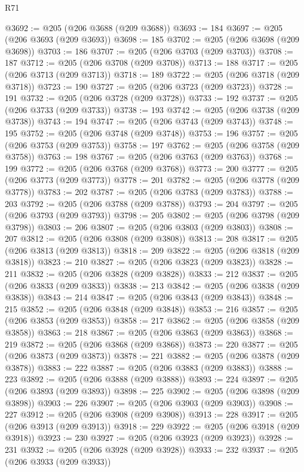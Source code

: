 \begin{lexlean}{R71}
\begin{coremodule}
@3692 := @205 (@206 @3688 (@209 @3688))
@3693 := 184
@3697 := @205 (@206 @3693 (@209 @3693))
@3698 := 185
@3702 := @205 (@206 @3698 (@209 @3698))
@3703 := 186
@3707 := @205 (@206 @3703 (@209 @3703))
@3708 := 187
@3712 := @205 (@206 @3708 (@209 @3708))
@3713 := 188
@3717 := @205 (@206 @3713 (@209 @3713))
@3718 := 189
@3722 := @205 (@206 @3718 (@209 @3718))
@3723 := 190
@3727 := @205 (@206 @3723 (@209 @3723))
@3728 := 191
@3732 := @205 (@206 @3728 (@209 @3728))
@3733 := 192
@3737 := @205 (@206 @3733 (@209 @3733))
@3738 := 193
@3742 := @205 (@206 @3738 (@209 @3738))
@3743 := 194
@3747 := @205 (@206 @3743 (@209 @3743))
@3748 := 195
@3752 := @205 (@206 @3748 (@209 @3748))
@3753 := 196
@3757 := @205 (@206 @3753 (@209 @3753))
@3758 := 197
@3762 := @205 (@206 @3758 (@209 @3758))
@3763 := 198
@3767 := @205 (@206 @3763 (@209 @3763))
@3768 := 199
@3772 := @205 (@206 @3768 (@209 @3768))
@3773 := 200
@3777 := @205 (@206 @3773 (@209 @3773))
@3778 := 201
@3782 := @205 (@206 @3778 (@209 @3778))
@3783 := 202
@3787 := @205 (@206 @3783 (@209 @3783))
@3788 := 203
@3792 := @205 (@206 @3788 (@209 @3788))
@3793 := 204
@3797 := @205 (@206 @3793 (@209 @3793))
@3798 := 205
@3802 := @205 (@206 @3798 (@209 @3798))
@3803 := 206
@3807 := @205 (@206 @3803 (@209 @3803))
@3808 := 207
@3812 := @205 (@206 @3808 (@209 @3808))
@3813 := 208
@3817 := @205 (@206 @3813 (@209 @3813))
@3818 := 209
@3822 := @205 (@206 @3818 (@209 @3818))
@3823 := 210
@3827 := @205 (@206 @3823 (@209 @3823))
@3828 := 211
@3832 := @205 (@206 @3828 (@209 @3828))
@3833 := 212
@3837 := @205 (@206 @3833 (@209 @3833))
@3838 := 213
@3842 := @205 (@206 @3838 (@209 @3838))
@3843 := 214
@3847 := @205 (@206 @3843 (@209 @3843))
@3848 := 215
@3852 := @205 (@206 @3848 (@209 @3848))
@3853 := 216
@3857 := @205 (@206 @3853 (@209 @3853))
@3858 := 217
@3862 := @205 (@206 @3858 (@209 @3858))
@3863 := 218
@3867 := @205 (@206 @3863 (@209 @3863))
@3868 := 219
@3872 := @205 (@206 @3868 (@209 @3868))
@3873 := 220
@3877 := @205 (@206 @3873 (@209 @3873))
@3878 := 221
@3882 := @205 (@206 @3878 (@209 @3878))
@3883 := 222
@3887 := @205 (@206 @3883 (@209 @3883))
@3888 := 223
@3892 := @205 (@206 @3888 (@209 @3888))
@3893 := 224
@3897 := @205 (@206 @3893 (@209 @3893))
@3898 := 225
@3902 := @205 (@206 @3898 (@209 @3898))
@3903 := 226
@3907 := @205 (@206 @3903 (@209 @3903))
@3908 := 227
@3912 := @205 (@206 @3908 (@209 @3908))
@3913 := 228
@3917 := @205 (@206 @3913 (@209 @3913))
@3918 := 229
@3922 := @205 (@206 @3918 (@209 @3918))
@3923 := 230
@3927 := @205 (@206 @3923 (@209 @3923))
@3928 := 231
@3932 := @205 (@206 @3928 (@209 @3928))
@3933 := 232
@3937 := @205 (@206 @3933 (@209 @3933))

\end{coremodule}
\end{lexlean}
